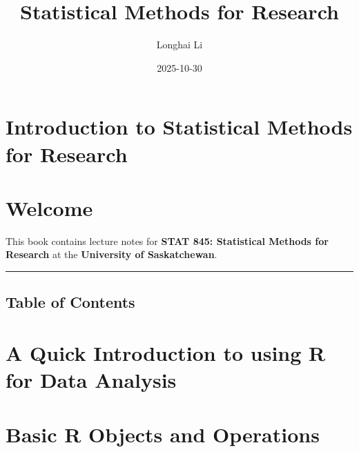 \documentclass[
  letterpaper,
]{scrbook}
\title{Statistical Methods for Research}
\author{Longhai Li}
\date{2025-10-30}
\renewcommand*\contentsname{Table of contents}
\newcommand\contentsname{Table of contents}
\begin{document}
\frontmatter
\maketitle

\renewcommand*\contentsname{Table of contents}
{
\hypersetup{linkcolor=}
\setcounter{tocdepth}{2}
\tableofcontents
}

\mainmatter
\section{Introduction to Statistical Methods for
Research}\label{introduction-to-statistical-methods-for-research}

\section*{Welcome}\label{welcome}


This book contains lecture notes for \textbf{STAT 845: Statistical
Methods for Research} at the \textbf{University of Saskatchewan}.

\begin{center}\rule{0.5\linewidth}{0.5pt}\end{center}

\subsection*{Table of Contents}\label{table-of-contents}

\label{book-toc}

\section{A Quick Introduction to using R for Data
Analysis}\label{a-quick-introduction-to-using-r-for-data-analysis}

\section{Basic R Objects and
Operations}\label{basic-r-objects-and-operations}
\end{document}
